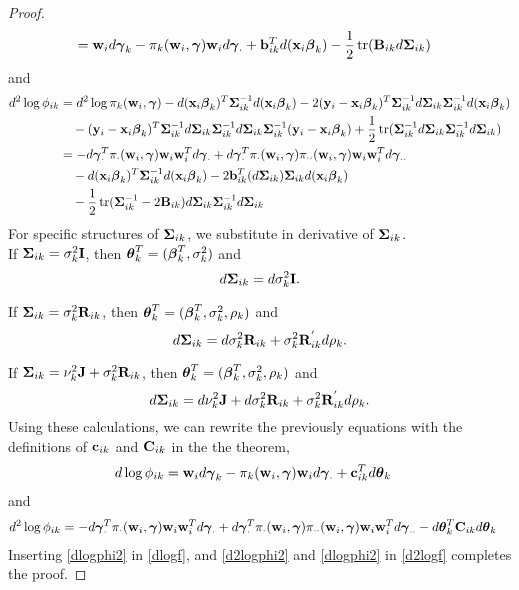 \begin{proof}
\begin{align*}
&=\mathbf w_{i} d\boldsymbol \gamma_{k} -\pi_{k}(\mathbf w_{i},\boldsymbol\gamma)\mathbf w_{i}d\boldsymbol\gamma_{\cdot}+\mathbf b^{T}_{ik}d(\mathbf x_{i}\boldsymbol \beta_{k})-\frac{1}{2}\operatorname{tr}(\mathbf B_{ik}d\boldsymbol\Sigma_{ik})
\end{align*}
and
\begin{align*}
d^{2}\log \phi_{ik}&=d^{2}\log \pi_{k}(\mathbf w_{i},\boldsymbol\gamma)-d(\mathbf x_{i}\boldsymbol \beta_{k})^{T}\boldsymbol\Sigma_{ik}^{-1}d(\mathbf x_{i}\boldsymbol \beta_{k})-2(\mathbf y_{i}-\mathbf x_{i}\boldsymbol \beta_{k})^{T}\boldsymbol\Sigma_{ik}^{-1}d\boldsymbol\Sigma_{ik}\boldsymbol\Sigma_{ik}^{-1}d(\mathbf x_{i}\boldsymbol\beta_{k})\\
&\quad-(\mathbf y_{i}-\mathbf x_{i}\boldsymbol \beta_{k})^{T}\boldsymbol\Sigma_{ik}^{-1}d\boldsymbol\Sigma_{ik}\boldsymbol\Sigma_{ik}^{-1}d\boldsymbol\Sigma_{ik}\boldsymbol\Sigma_{ik}^{-1}(\mathbf y_{i}-\mathbf x_{i}\boldsymbol\beta_{k})+\frac{1}{2}\operatorname{tr}(\boldsymbol\Sigma_{ik}^{-1}d\boldsymbol\Sigma_{ik}\boldsymbol\Sigma_{ik}^{-1}d\boldsymbol\Sigma_{ik})\\
&=-d\boldsymbol\gamma_{\cdot}^{T}\pi_{\cdot}(\mathbf w_{i},\boldsymbol\gamma)\mathbf w_{i}\mathbf w_{i}^{T}d\boldsymbol\gamma_{\cdot}+d\boldsymbol\gamma_{\cdot}^{T}\pi_{\cdot}(\mathbf w_{i},\boldsymbol\gamma)\pi_{\cdot\cdot}(\mathbf w_{i},\boldsymbol\gamma)\mathbf w_{i}\mathbf w_{i}^{T}d\boldsymbol\gamma_{\cdot\cdot}\\
&\quad-d(\mathbf x_{i}\boldsymbol \beta_{k})^{T}\boldsymbol\Sigma_{ik}^{-1}d(\mathbf x_{i}\boldsymbol \beta_{k})-2\mathbf b_{ik}^{T}(d\boldsymbol\Sigma_{ik})\boldsymbol\Sigma_{ik}d(\mathbf x_{i}\boldsymbol\beta_{k})\\
&\quad-\frac{1}{2}\operatorname{tr}(\boldsymbol\Sigma_{ik}^{-1}-2\mathbf B_{ik})d\boldsymbol\Sigma_{ik}\boldsymbol\Sigma_{ik}^{-1}d\boldsymbol\Sigma_{ik}
\end{align*}
For specific structures of $\boldsymbol\Sigma_{ik}$, we substitute in derivative of $\boldsymbol\Sigma_{ik}$.\\

If $\boldsymbol\Sigma_{ik}=\sigma_{k}^{2}\mathbf I$, then $\boldsymbol\theta_{k}^{T}=(\boldsymbol\beta_{k}^{T},\sigma^{2}_{k})$ and
$$d\boldsymbol\Sigma_{ik}=d\sigma_{k}^{2}\mathbf I.$$

If $\boldsymbol\Sigma_{ik}=\sigma_{k}^{2}\mathbf R_{ik}$, then $\boldsymbol\theta_{k}^{T}=(\boldsymbol\beta_{k}^{T},\sigma^{2}_{k},\rho_{k})$ and
$$d\boldsymbol\Sigma_{ik}=d\sigma_{k}^{2}\mathbf R_{ik} +\sigma_{k}^{2}\mathbf R^{'}_{ik}d\rho_{k}.$$

If $\boldsymbol\Sigma_{ik}=\nu_{k}^{2}\mathbf J+\sigma_{k}^{2}\mathbf R_{ik}$, then $\boldsymbol\theta_{k}^{T}=(\boldsymbol\beta_{k}^{T},\sigma^{2}_{k},\rho_{k})$ and
$$d\boldsymbol\Sigma_{ik}=d\nu_{k}^{2}\mathbf J + d\sigma_{k}^{2}\mathbf R_{ik} +\sigma_{k}^{2}\mathbf R^{'}_{ik}d\rho_{k}.$$
Using these calculations, we can rewrite the previously equations with the definitions of $\mathbf c_{ik}$ and $\mathbf C_{ik}$ in the the theorem,
\begin{align}\label{dlogphi2}
d\log \phi_{ik}&=\mathbf w_{i} d\boldsymbol \gamma_{k} -\pi_{k}(\mathbf w_{i},\boldsymbol\gamma)\mathbf w_{i}d\boldsymbol\gamma_{\cdot}+\mathbf c^{T}_{ik}d\boldsymbol\theta_{k} 
\end{align}
and
\begin{align}\label{d2logphi2}
d^{2}\log \phi_{ik}
&=-d\boldsymbol\gamma_{\cdot}^{T}\pi_{\cdot}(\mathbf w_{i},\boldsymbol\gamma)\mathbf w_{i}\mathbf w_{i}^{T}d\boldsymbol\gamma_{\cdot}+d\boldsymbol\gamma_{\cdot}^{T}\pi_{\cdot}(\mathbf w_{i},\boldsymbol\gamma)\pi_{\cdot\cdot}(\mathbf w_{i},\boldsymbol\gamma)\mathbf w_{i}\mathbf w_{i}^{T}d\boldsymbol\gamma_{\cdot\cdot}-d\boldsymbol\theta_{k}^{T}\mathbf C_{ik}d\boldsymbol\theta_{k}
\end{align}
Inserting \eqref{dlogphi2} in \eqref{dlogf}, and \eqref{d2logphi2} and \eqref{dlogphi2} in \eqref{d2logf} completes the proof.
\end{proof}
